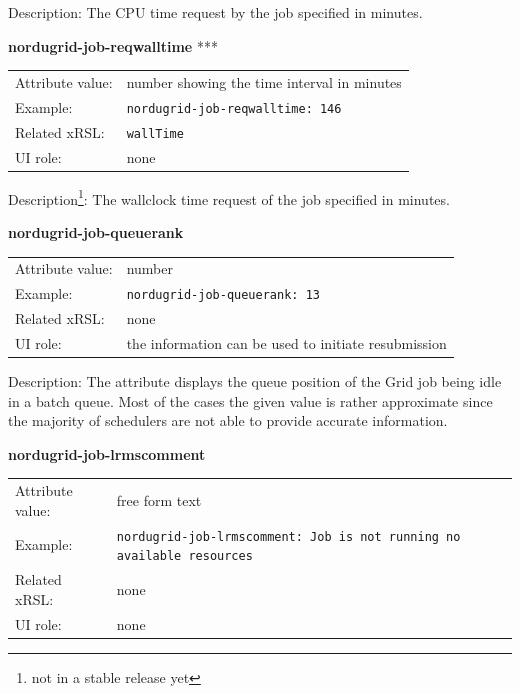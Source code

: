 \documentclass{article}
\begin{document}
Description: The CPU time request by the job specified in minutes.


  \hspace*{0.5cm}
  \begin{shaded}
    \textbf{nordugrid-job-reqwalltime} ***
  \end{shaded}
  \begin{tabular}{lp{10cm}}  
    Attribute value:& number showing the time interval in minutes\\
    Example:& \verb#nordugrid-job-reqwalltime: 146#\\
    Related xRSL:& \verb#wallTime#\\
    UI role:& none\\
  \end{tabular}

Description\footnote{not in a stable release yet}: The wallclock time request of the job specified in minutes.


  \hspace*{0.5cm}
  \begin{shaded}
    \textbf{nordugrid-job-queuerank}
  \end{shaded}
  \begin{tabular}{lp{10cm}}  
    Attribute value:& number\\
    Example:& \verb#nordugrid-job-queuerank: 13#\\
    Related xRSL:& none\\
    UI role:& the information can be used to initiate resubmission\\
  \end{tabular}

Description: The attribute displays the queue position of the Grid job being 
idle in a batch queue. Most of the cases the given value is rather 
approximate since the majority of schedulers are not able to provide 
accurate information.


  \hspace*{0.5cm}
  \begin{shaded}
    \textbf{nordugrid-job-lrmscomment}
  \end{shaded}
  \begin{tabular}{lp{10cm}}  
    Attribute value:& free form text\\
    Example:& \verb#nordugrid-job-lrmscomment: Job is not running no available resources#\\
    Related xRSL:& none\\
    UI role:& none\\ 
  \end{tabular}
\end{document}
